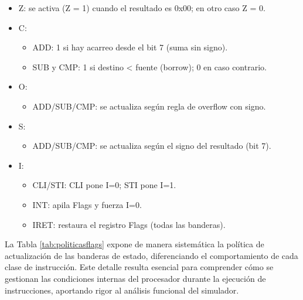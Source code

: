 \documentclass[12pt,oneside]{templates/unerthesis}
\providecommand{\tightlist}{%
  \setlength{\itemsep}{0pt}\setlength{\parskip}{0pt}}
\begin{document}
\begin{itemize}
\item
  Z: se activa (Z = 1) cuando el resultado es 0x00; en otro caso Z = 0.
\item
  C:

  \begin{itemize}
  \item
    ADD: 1 si hay acarreo desde el bit 7 (suma sin signo).
  \item
    SUB y CMP: 1 si destino \textless{} fuente (borrow); 0 en caso contrario.
  \end{itemize}
\item
  O:

  \begin{itemize}
  \tightlist
  \item
    ADD/SUB/CMP: se actualiza según regla de overflow con signo.
  \end{itemize}
\item
  S:

  \begin{itemize}
  \tightlist
  \item
    ADD/SUB/CMP: se actualiza según el signo del resultado (bit 7).
  \end{itemize}
\item
  I:

  \begin{itemize}
  \item
    CLI/STI: CLI pone I=0; STI pone I=1.
  \item
    INT: apila Flags y fuerza I=0.
  \item
    IRET: restaura el registro Flags (todas las banderas).
  \end{itemize}
\end{itemize}

La Tabla \ref{tab:politicasflags} expone de manera sistemática la política de actualización de las banderas de estado, diferenciando el comportamiento de cada clase de instrucción. Este detalle resulta esencial para comprender cómo se gestionan las condiciones internas del procesador durante la ejecución de instrucciones, aportando rigor al análisis funcional del simulador.
\end{document}
